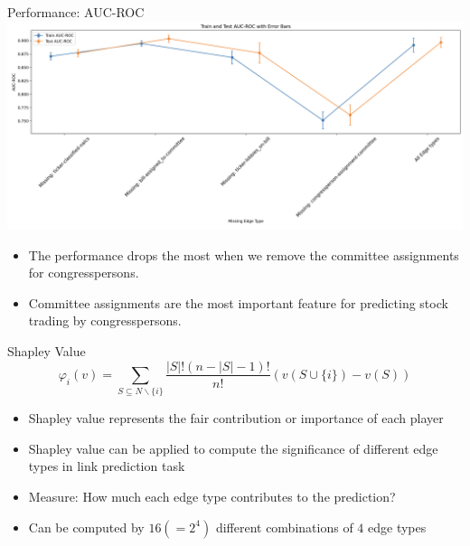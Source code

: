\documentclass{beamer}
\begin{document}
	\begin{frame}{Performance: AUC-ROC}
		\centering	\includegraphics[scale=0.22]{./images/auc2.png}

		\begin{itemize}
			\item The performance drops the most when we remove the committee assignments for congresspersons.
			\item Committee assignments are the most important feature for predicting stock trading by congresspersons. 
		\end{itemize}
	\end{frame}

	\begin{frame}{Shapley Value}
		$$
\varphi_i(v)=\sum_{S \subseteq N \backslash\{i\}} \frac{|S| !(n-|S|-1) !}{n !}(v(S \cup\{i\})-v(S))
$$
		\begin{itemize}
			\item Shapley value represents the fair contribution or importance of each player
			\item Shapley value can be applied to compute the significance of different edge types in link prediction task
			\item Measure: How much each edge type contributes to the prediction?
			\item Can be computed by $16 (=2^4)$ different combinations of $4$ edge types
		\end{itemize}
	\end{frame}
\end{document}
